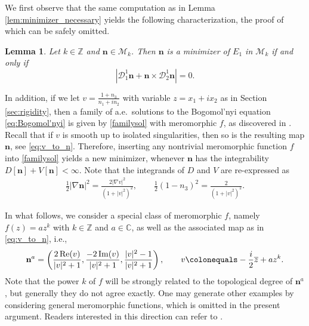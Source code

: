 \documentclass{amsart}
\numberwithin{equation}{section}
\newtheorem{lemma}[theorem]{Lemma}
\theoremstyle{definition}
\theoremstyle{remark}
\newcommand{\Z}{\mathbb{Z}}
\newcommand{\C}{\mathbb{C}}
\newcommand{\boD}{\mathcal{D}}
\newcommand{\boM}{\mathcal{M}}
\renewcommand{\Im}{\mathop{{\rm Im}}\nolimits}
\renewcommand{\Re}{\mathop{{\rm Re}}\nolimits}
\newcommand{\nab}{{\nabla}}							%
\newcommand{\bn}{{\mathbf{n}}}
\begin{document}
We first observe that the same computation as in Lemma \ref{lem:minimizer_necessary} yields the following characterization, the proof of which can be safely omitted.

\begin{lemma}\label{lem:minimality_Bog_r=1}
    Let $k\in\Z$ and $\bn\in\boM_k$.
    Then $\bn$ is a minimizer of $E_1$ in $\boM_k$ if and only if 
    \begin{equation}\label{eq:Bogomol'nyi}
    |\boD^1_1 \bn + \bn\times \boD^1_2 \bn| =0.
    \end{equation}
\end{lemma}

In addition, if we let $v= \frac{1+n_3}{n_1+in_2}$ with variable $z=x_1+ix_2$ as in Section \ref{sec:rigidity}, then a family of a.e.\ solutions to the Bogomol'nyi equation \eqref{eq:Bogomol'nyi} is given by \eqref{familysol} with meromorphic $f$, as discovered in \cite{MR4091507}.
Recall that if $v$ is smooth up to isolated singularities, then so is the resulting map $\bn$, see \eqref{eq:v_to_n}.
Therefore, inserting any nontrivial meromorphic function $f$ into \eqref{familysol} yields a new minimizer, whenever $\bn$ has the integrability $D[\bn]+V[\bn]<\infty$.
Note that the integrands of $D$ and $V$ are re-expressed as
\begin{align}\label{eq:integrands_v}
\frac 12|\nab \bn|^2 = \frac{2|\nab v|^2}{(1+|v|^2)^2}, \qquad 
\frac 12 (1-n_3)^2 =  \frac{2}{(1+|v|^2)^2}.
\end{align}

In what follows, we consider a special class of meromorphic $f$, namely $f(z)=az^{k}$ with $k\in\Z$ and $a\in\C$, as well as the associated map as in \eqref{eq:v_to_n}, i.e.,
\begin{equation}\label{eq:general_formula_n_and_v_for_f=az^k}
    \bn^a=\left(\frac{2\Re(v)}{|v|^2+1},\frac{-2\Im(v)}{|v|^2+1},\frac{|v|^2-1}{|v|^2+1}\right), \qquad v \colonequals -\frac{i}{2}\overline{z} + az^{k}.
\end{equation}
Note that the power $k$ of $f$ will be strongly related to the topological degree of $\bn^a$, but generally they do not agree exactly.
One may generate other examples by considering general meromorphic functions, which is omitted in the present argument. Readers interested in this direction can refer to \cite{MR4091507}.
\end{document}
